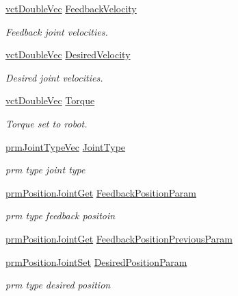 \begin{DoxyCompactItemize}
\hyperlink{vct_dynamic_vector_types_8h_ade4b3068c86fb88f41af2e5187e491c2}{vct\+Double\+Vec} \hyperlink{classmts_p_i_d_ad881aba30dc205f26ce1ce69763bf9a6}{Feedback\+Velocity}
\begin{DoxyCompactList}\small\item\em Feedback joint velocities. \end{DoxyCompactList}\item 
\hyperlink{vct_dynamic_vector_types_8h_ade4b3068c86fb88f41af2e5187e491c2}{vct\+Double\+Vec} \hyperlink{classmts_p_i_d_aacc1516bf1b22d2c0e0b184fe7928b42}{Desired\+Velocity}
\begin{DoxyCompactList}\small\item\em Desired joint velocities. \end{DoxyCompactList}\item 
\hyperlink{vct_dynamic_vector_types_8h_ade4b3068c86fb88f41af2e5187e491c2}{vct\+Double\+Vec} \hyperlink{classmts_p_i_d_a928a19f9bc0b311ec5743a108b2f8534}{Torque}
\begin{DoxyCompactList}\small\item\em Torque set to robot. \end{DoxyCompactList}\item 
\hyperlink{prm_joint_type_8h_a3a21392b4484e2e24aa0b73d553f940e}{prm\+Joint\+Type\+Vec} \hyperlink{classmts_p_i_d_ae108b12c62723774cee553f7e76213f6}{Joint\+Type}
\begin{DoxyCompactList}\small\item\em prm type joint type \end{DoxyCompactList}\item 
\hyperlink{classprm_position_joint_get}{prm\+Position\+Joint\+Get} \hyperlink{classmts_p_i_d_ab504e84dce2591651f13dde667e34497}{Feedback\+Position\+Param}
\begin{DoxyCompactList}\small\item\em prm type feedback positoin \end{DoxyCompactList}\item 
\hyperlink{classprm_position_joint_get}{prm\+Position\+Joint\+Get} \hyperlink{classmts_p_i_d_a28b48c75d2a18ae085e903a4d2668527}{Feedback\+Position\+Previous\+Param}
\item 
\hyperlink{classprm_position_joint_set}{prm\+Position\+Joint\+Set} \hyperlink{classmts_p_i_d_a7ef37febb5f1248dcccfa6a0e857b7a9}{Desired\+Position\+Param}
\begin{DoxyCompactList}\small\item\em prm type desired position \end{DoxyCompactList}\item 

\end{DoxyCompactItemize}
